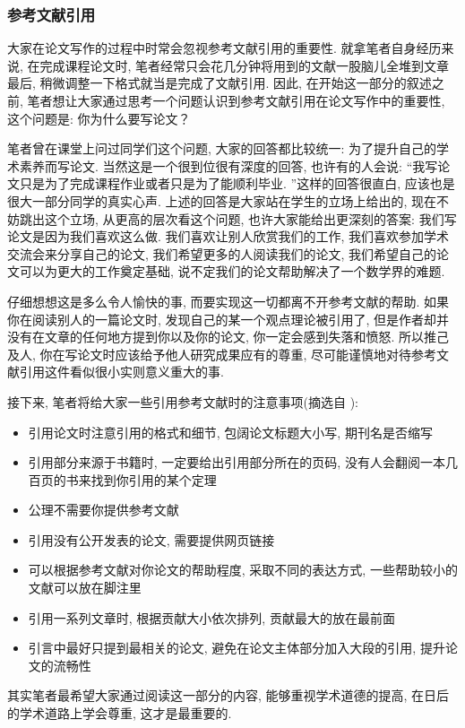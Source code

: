 \documentclass{formatBook}
\begin{document}
\subsubsection{参考文献引用}
大家在论文写作的过程中时常会忽视参考文献引用的重要性. 就拿笔者自身经历来说, 在完成课程论文时, 笔者经常只会花几分钟将用到的文献一股脑儿全堆到文章最后, 稍微调整一下格式就当是完成了文献引用. 因此, 在开始这一部分的叙述之前, 笔者想让大家通过思考一个问题认识到参考文献引用在论文写作中的重要性, 这个问题是: 你为什么要写论文？\par
笔者曾在课堂上问过同学们这个问题, 大家的回答都比较统一: 为了提升自己的学术素养而写论文. 当然这是一个很到位很有深度的回答, 也许有的人会说: “我写论文只是为了完成课程作业或者只是为了能顺利毕业. ”这样的回答很直白, 应该也是很大一部分同学的真实心声. 上述的回答是大家站在学生的立场上给出的, 现在不妨跳出这个立场, 从更高的层次看这个问题, 也许大家能给出更深刻的答案: 我们写论文是因为我们喜欢这么做. 我们喜欢让别人欣赏我们的工作, 我们喜欢参加学术交流会来分享自己的论文, 我们希望更多的人阅读我们的论文, 我们希望自己的论文可以为更大的工作奠定基础, 说不定我们的论文帮助解决了一个数学界的难题. \par
仔细想想这是多么令人愉快的事, 而要实现这一切都离不开参考文献的帮助. 如果你在阅读别人的一篇论文时, 发现自己的某一个观点理论被引用了, 但是作者却并没有在文章的任何地方提到你以及你的论文, 你一定会感到失落和愤怒. 所以推己及人, 你在写论文时应该给予他人研究成果应有的尊重, 尽可能谨慎地对待参考文献引用这件看似很小实则意义重大的事. \par
接下来, 笔者将给大家一些引用参考文献时的注意事项(摘选自 \cite{pakhow}): 
\begin{itemize}
    \item 引用论文时注意引用的格式和细节, 包阔论文标题大小写, 期刊名是否缩写
    \item 引用部分来源于书籍时, 一定要给出引用部分所在的页码, 没有人会翻阅一本几百页的书来找到你引用的某个定理
    \item 公理不需要你提供参考文献
    \item 引用没有公开发表的论文, 需要提供网页链接
    \item 可以根据参考文献对你论文的帮助程度, 采取不同的表达方式, 一些帮助较小的文献可以放在脚注里
    \item 引用一系列文章时, 根据贡献大小依次排列, 贡献最大的放在最前面
    \item 引言中最好只提到最相关的论文, 避免在论文主体部分加入大段的引用, 提升论文的流畅性
\end{itemize}
\par
其实笔者最希望大家通过阅读这一部分的内容, 能够重视学术道德的提高, 在日后的学术道路上学会尊重, 这才是最重要的. 
\end{document}
